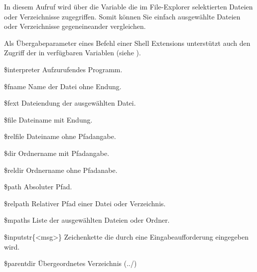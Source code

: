 In diesem Aufruf wird über die Variable  die im File-Explorer selektierten Dateien oder Verzeichnisse zugegriffen. Somit können Sie einfach ausgewählte Dateien oder Verzeichnisse gegeneineander vergleichen.

Als Übergabeparameter eines Befehl einer Shell Extensions unterstützt auch den Zugriff der in \codeblocks verfügbaren Variablen (siehe ).

\begin{codeentry}
\item[\$interpreter] Aufzurufendes Programm.
\item[\$fname] Name der Datei ohne Endung.
\item[\$fext] Dateiendung der ausgewählten Datei.
\item[\$file]Dateiname mit Endung.
\item[\$relfile] Dateiname ohne Pfadangabe.
\item[\$dir] Ordnername mit Pfadangabe.
\item[\$reldir] Ordnername ohne Pfadanabe.
\item[\$path] Absoluter Pfad.
\item[\$relpath] Relativer Pfad einer Datei oder Verzeichnis.
\item[\$mpaths] Liste der ausgewählten Dateien oder Ordner.
\item[\$inputstr\{<msg>\}] Zeichenkette die durch eine Eingabeaufforderung eingegeben wird.
\item[\$parentdir] Übergeordnetes Verzeichnis (../)
\end{codeentry}



%
%
%
%

